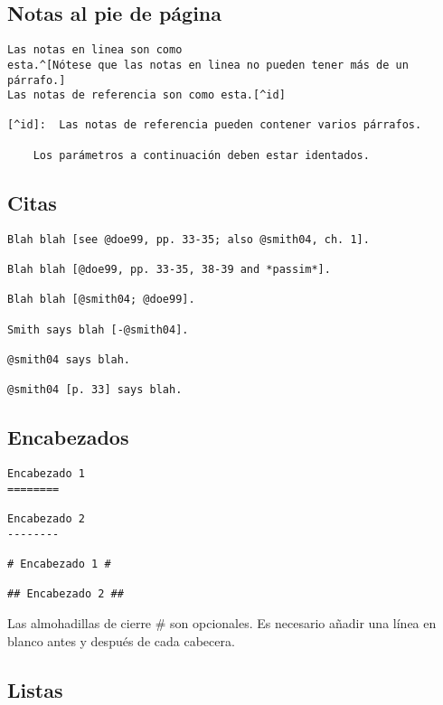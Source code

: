\documentclass[12pt,spanish,]{article}
\begin{document}
\hypertarget{notas-al-pie-de-puxe1gina}{%
\subsection{Notas al pie de página}\label{notas-al-pie-de-puxe1gina}}

\begin{verbatim}
Las notas en linea son como
esta.^[Nótese que las notas en linea no pueden tener más de un párrafo.]
Las notas de referencia son como esta.[^id]

[^id]:  Las notas de referencia pueden contener varios párrafos.

    Los parámetros a continuación deben estar identados.
\end{verbatim}

\hypertarget{citas}{%
\subsection{Citas}\label{citas}}

\begin{verbatim}
Blah blah [see @doe99, pp. 33-35; also @smith04, ch. 1].

Blah blah [@doe99, pp. 33-35, 38-39 and *passim*].

Blah blah [@smith04; @doe99].

Smith says blah [-@smith04].

@smith04 says blah.

@smith04 [p. 33] says blah.
\end{verbatim}

\hypertarget{encabezados}{%
\subsection{Encabezados}\label{encabezados}}

\begin{verbatim}
Encabezado 1
========

Encabezado 2
--------

# Encabezado 1 #

## Encabezado 2 ##
\end{verbatim}

Las almohadillas de cierre \# son opcionales. Es necesario añadir una
línea en blanco antes y después de cada cabecera.

\hypertarget{listas}{%
\subsection{Listas}\label{listas}}
\end{document}
